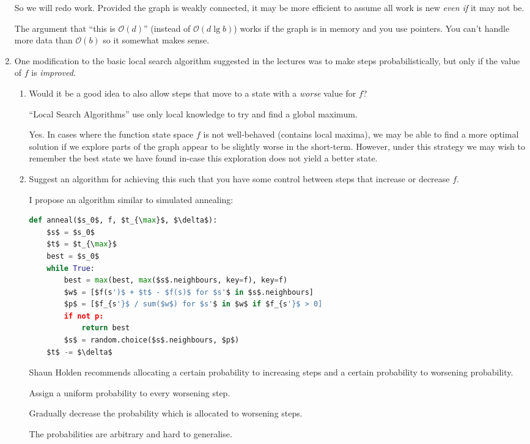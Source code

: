 \documentclass[10pt,\jkfside,a4paper]{article}
\begin{document}
\begin{enumerate}
{So we will redo work. Provided the graph is weakly connected, it may be more
efficient to assume all work is new \textit{even if} it may not be.

The argument that ``this is $\mathcal O(d)$'' (instead of
$\mathcal O(d \lg b)$) works if the graph is in memory and you use pointers.
You can't handle more data than $\mathcal O(b)$ so it somewhat makes sense.
}

\item One modification to the basic local search algorithm suggested in the
lectures was to make steps probabilistically, but only if the value of $f$
is \textit{improved}.
\begin{enumerate}[label=(\alph*)]

\item Would it be a good idea to also allow steps that move to a state with
a \textit{worse} value for $f$?

{\color{blue}
``Local Search Algorithms'' use only local knowledge to try and find a
global maximum.
}

Yes. In cases where the function state space $f$ is not well-behaved
(contains local maxima), we may be able to find a more optimal solution if
we explore parts of the graph appear to be slightly worse in the short-term.
However, under this strategy we may wish to remember the best state we have
found in-case this exploration does not yield a better state.

\item Suggest an algorithm for achieving this such that you have some
control between steps that increase or decrease $f$.

I propose an algorithm similar to simulated annealing:
\begin{lstlisting}[language=Python, mathescape=true]
def anneal($s_0$, f, $t_{\max}$, $\delta$):
    $s$ = $s_0$
    $t$ = $t_{\max}$
    best = $s_0$
    while True:
        best = max(best, max($s$.neighbours, key=f), key=f)
        $w$ = [$f(s')$ + $t$ - $f(s)$ for $s'$ in $s$.neighbours]
        $p$ = [$f_{s'}$ / sum($w$) for $s'$ in $w$ if $f_{s'}$ > 0]
        if not p:
        	return best
        $s$ = random.choice($s$.neighbours, $p$)
	$t$ -= $\delta$
\end{lstlisting}

{\color{blue}
Shaun Holden recommends allocating a certain probability to increasing steps
and a certain probability to worsening probability.

Assign a uniform probability to every worsening step.

Gradually decrease the probability which is allocated to worsening steps.

The probabilities are arbitrary and hard to generalise.
}

\end{enumerate}

\end{enumerate}
\end{document}
